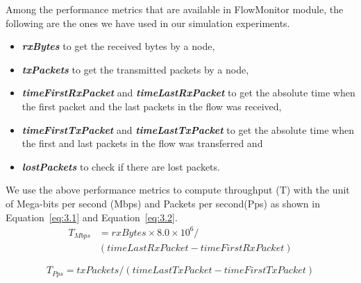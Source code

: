 Among the performance metrics that are available in FlowMonitor module, the following are the ones we have used in our simulation experiments.

\begin{itemize}
	\item \textbf{\textit{rxBytes}} to get the received bytes by a node,
	\item \textbf{\textit{txPackets}} to get the transmitted packets by a node,
	\item \textbf{\textit{timeFirstRxPacket}} and \textbf{\textit{timeLastRxPacket}} to get the absolute time when the first packet and the last packets in the flow was received,
	\item  \textbf{\textit{timeFirstTxPacket}} and \textbf{\textit{timeLastTxPacket}} to get the absolute time when the first and last packets in the flow was transferred and 
	\item \textbf{\textit{lostPackets}} to check if there are lost packets.
\end{itemize}

We use the above performance metrics to compute throughput (T) with the unit of Mega-bits per second (Mbps) and Packets per second(Pps) as shown in Equation~\ref{eq:3.1} and Equation~\ref{eq:3.2}. 
\begin{equation} \label{eq:3.1}
\begin{split}
T_{Mbps} &= rxBytes \times 8.0 \times 10^6 /\\
  & (timeLastRxPacket - timeFirstRxPacket)
\end{split}
\end{equation}

\begin{equation} \label{eq:3.2}
T_{Pps} = txPackets / (timeLastTxPacket - timeFirstTxPacket)
\end{equation}